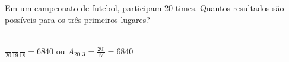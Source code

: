 \begin{ex}
 Em um campeonato de futebol, participam 20 times. Quantos resultados são possíveis para os três primeiros lugares?
   \begin{sol}
       \phantom{A} \\
    $\frac{\phantom{A}}{20}\frac{\phantom{A}}{19}\frac{\phantom{A}}{18}= 6840$ ou $A_{{20},{3}}=\frac{20!}{17!}= 6840$
   \end{sol}
\end{ex}